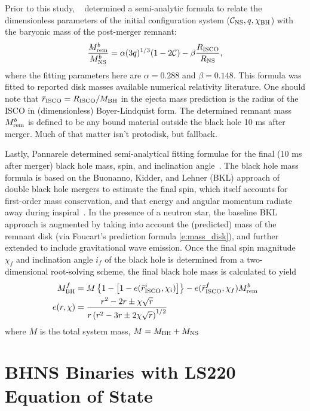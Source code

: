 Prior to this study, ~\cite{Foucart2012} determined a semi-analytic formula to relate the dimensionless parameters of the initial configuration system ($\mathcal{C}_{\rm NS}, q, \chi_{\rm BH} $) with the baryonic mass of the post-merger remnant:
\begin{align}
\label{e:mass_disk}
\frac{M^b_{\rm rem}}{M^b_{\rm NS}} = 
\alpha (3 q)^{1/3} (1 - 2 \mathcal{C} )
-\beta  \frac{R_{\rm ISCO}}{R_{\rm NS}},
\end{align}
where the fitting parameters here are $\alpha = 0.288$ and $\beta = 0.148$.
This formula was fitted to reported disk masses available numerical relativity literature.
One should note that $\bar{r}_{\rm ISCO} = R_{\rm ISCO}/M_{\rm BH}$ in the ejecta mass prediction is the radius of the ISCO in (dimensionless)  Boyer-Lindquist form.
The determined remnant mass $M^b_{\rm rem}$ is defined to be any bound material outside the black hole 10 ms after merger.  
Much of that matter isn't protodisk, but fallback.

Lastly, Pannarele determined semi-analytical fitting formulae for the final (10 ms after merger) black hole mass, spin, and inclination angle~\cite{PannaraleEtAl2013,Pannarale:2014}.
The black hole mass formula is based on the Buonanno, Kidder, and Lehner (BKL) approach of double black hole mergers to estimate the final spin, which itself accounts for first-order mass conservation, and that energy and angular momentum radiate away during inspiral~\cite{Buonanno2008a}.  
In the presence of a neutron star, the baseline BKL approach is augmented by taking into account the (predicted) mass of the remnant disk (via Foucart's prediction formula \ref{e:mass_disk}), and further extended to include gravitational wave emission.
Once the final spin magnitude  $\chi_f$ and inclination angle $i_f$ of the black hole is determined from a two-dimensional root-solving scheme, the final black hole mass is calculated to yield
\begin{align}
M^f_{\rm BH} &= 
M \left \{ 
1 - \left[1-e(\bar{r}^i_{\rm ISCO}, \chi_i) \right]
\right \}
- e(\bar{r}^f_{\rm ISCO}, \chi_f) M^b_{\rm rem}\\
e(r, \chi) &= 
\frac{ r^2 - 2 r \pm \chi \sqrt{r} }
{ r \left(r^2 - 3r \pm 2 \chi \sqrt{r}\right)^{1/2} }
\end{align}
where $M$ is the total system mass, $M = M_{\rm BH} +M_{\rm NS}$

\section{BHNS Binaries with LS220 Equation of State}


